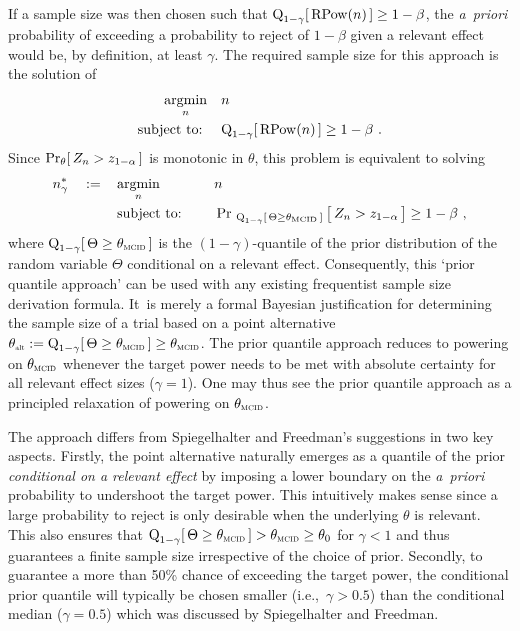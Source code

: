 \documentclass{article}
\renewcommand{\Pr}{\operatorname{Pr}}
\newcommand{\st}{\operatorname{subject\ to:\ }}
\newcommand{\argmin}[1]{\operatornamewithlimits{argmin}_{#1}}
\begin{document}
If a sample size was then chosen such that ${\operatorname{Q}_{ 1-\gamma }}[\,\operatorname{RPow}({ n })\,]\geq 1 - \beta$, the  \textit{a~priori} probability of exceeding a probability to reject of $1-\beta$ given a relevant effect would be, by definition, at least $\gamma$.
The required sample size for this approach is the solution of
\begin{align}
    \argmin{n}\quad &n \nonumber\\
    \st \quad &\quant{1-\gamma}[\,\rpower{n}\,] \geq 1 - \beta \ .
\end{align}
Since $\Pr_{\theta}[\,Z_n > \criticalvalue\,]$ is monotonic in $\theta$, this problem is equivalent to solving
\begin{align}
    n_{\gamma}^* \quad := \quad & \argmin{n} \quad &&n \nonumber\\
    &\st \quad &&\Pr_{\ \quant{1 - \gamma}[\, \Theta \geq \mcid \,]}\big[\,Z_n > \criticalvalue\,\big] \geq 1 - \beta \ ,
\end{align}
where $\quant{1 - \gamma}[\, \Theta \geq \mcid \,]$ is the $(1-\gamma)$-quantile of the prior distribution of the random variable $\Theta$ conditional on a relevant effect.
Consequently, this `prior quantile approach' can be used with any existing frequentist sample size derivation formula.
It~is merely a formal Bayesian justification for determining the sample size of a trial based on a point alternative ${\altv:=\quant{1 - \gamma}[\, \Theta \geq \mcid \,]\geq\mcid}$.
The prior quantile approach reduces to powering on $\mcid$ whenever the target power needs to be met with absolute certainty for all relevant effect sizes ($\gamma=1$).
One may thus see the prior quantile approach as a principled relaxation of powering on $\mcid$.

The approach differs from Spiegelhalter and Freedman's suggestions in two key aspects.
Firstly, the point alternative naturally emerges as a quantile of the prior \emph{conditional on a relevant effect} by imposing a lower boundary on the \textit{a~priori} probability to undershoot the target power.
This intuitively makes sense since a large probability to reject is only desirable when the underlying $\theta$ is relevant.
This also ensures that $\quant{1 - \gamma}[\, \Theta \geq \mcid \,]>\mcid\geq\theta_0$ for $\gamma<1$ and thus guarantees a finite sample size irrespective of the choice of prior.
Secondly, to guarantee a more than 50\% chance of exceeding the target power, the conditional prior quantile will typically be chosen smaller (i.e.,~$\gamma>0.5$) than the conditional median ($\gamma=0.5$) which was discussed by Spiegelhalter and Freedman.
\end{document}
